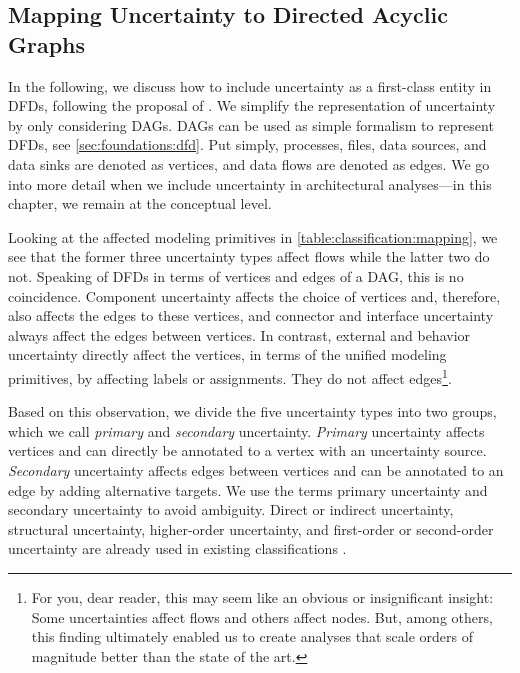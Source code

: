 \subsection{Mapping Uncertainty to Directed Acyclic Graphs}

In the following, we discuss how to include uncertainty as a first-class entity in \acp{DFD}, following the proposal of \textcite{garlan_software_2010}.
We simplify the representation of uncertainty by only considering \acp{DAG}.
\acp{DAG} can be used as simple formalism to represent \acp{DFD}, see \autoref{sec:foundations:dfd}.
Put simply, processes, files, data sources, and data sinks are denoted as vertices, and data flows are denoted as edges.
We go into more detail when we include uncertainty in architectural analyses---in this chapter, we remain at the conceptual level.

Looking at the affected modeling primitives in \autoref{table:classification:mapping}, we see that the former three uncertainty types affect flows while the latter two do not.
Speaking of \acp{DFD} in terms of vertices and edges of a \ac{DAG}, this is no coincidence.
Component uncertainty affects the choice of vertices and, therefore, also affects the edges to these vertices, and connector and interface uncertainty always affect the edges between vertices.
In contrast, external and behavior uncertainty directly affect the vertices, in terms of the unified modeling primitives, by affecting labels or assignments.
They do not affect edges\footnote{For you, dear reader, this may seem like an obvious or insignificant insight: Some uncertainties affect flows and others affect nodes. But, among others, this finding ultimately enabled us to create analyses that scale orders of magnitude better than the state of the art.}.

Based on this observation, we divide the five uncertainty types into two groups, which we call \emph{primary} and \emph{secondary} uncertainty.
\emph{Primary} uncertainty affects vertices and can directly be annotated to a vertex with an uncertainty source.
\emph{Secondary} uncertainty affects edges between vertices and can be annotated to an edge by adding alternative targets.
We use the terms primary uncertainty and secondary uncertainty to avoid ambiguity.
Direct or indirect uncertainty, structural uncertainty, higher-order uncertainty, and first-order or second-order uncertainty are already used in existing classifications \cite{perez-palacin_uncertainties_2014,walker_defining_2003,armour_five_2000}.


